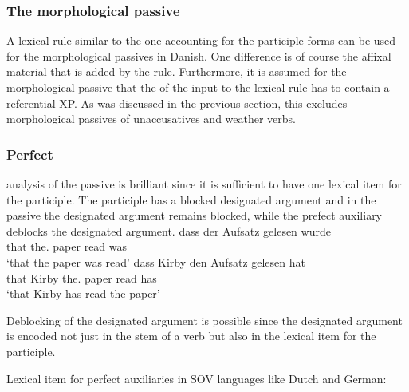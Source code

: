 \subsubsection{The morphological passive}


A lexical rule similar to the one accounting for the participle forms can be used for the
morphological passives in Danish. One difference is of course the affixal material that is added by
the rule. Furthermore, it is assumed for the morphological passive that the \da of the input to the lexical rule has to contain
a referential XP. As was discussed in the previous section, this excludes morphological passives of
unaccusatives and weather verbs. 





\subsubsection{Perfect}

 analysis of the passive is brilliant since it is sufficient to have one lexical
item for the participle. The participle has a blocked designated argument and in the passive the
designated argument remains blocked, while the prefect auxiliary deblocks the designated
argument. 
\eal
\ex
\gll dass der        Aufsatz gelesen wurde\\
     that the.\NOM{} paper   read    was\\
\glt `that the paper was read'
\ex
\gll dass Kirby den Aufsatz gelesen hat\\
     that Kirby the.\ACC{} paper read has\\
\glt `that Kirby has read the paper'
\zl

Deblocking of the designated argument is possible since the designated argument is encoded not just in the stem of a verb
but also in the lexical item for the participle.   

\ea
Lexical item for perfect auxiliaries in SOV languages like Dutch and German:\\
\z



